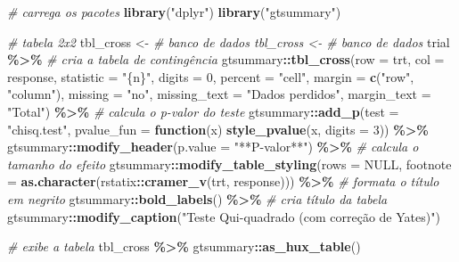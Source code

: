 \documentclass[
]{book}
\newenvironment{Shaded}{\begin{snugshade}}{\end{snugshade}}
\newcommand{\AttributeTok}[1]{\textcolor[rgb]{0.13,0.29,0.53}{#1}}
\newcommand{\CommentTok}[1]{\textcolor[rgb]{0.56,0.35,0.01}{\textit{#1}}}
\newcommand{\ConstantTok}[1]{\textcolor[rgb]{0.56,0.35,0.01}{#1}}
\newcommand{\ControlFlowTok}[1]{\textcolor[rgb]{0.13,0.29,0.53}{\textbf{#1}}}
\newcommand{\DecValTok}[1]{\textcolor[rgb]{0.00,0.00,0.81}{#1}}
\newcommand{\FunctionTok}[1]{\textcolor[rgb]{0.13,0.29,0.53}{\textbf{#1}}}
\newcommand{\NormalTok}[1]{#1}
\newcommand{\OtherTok}[1]{\textcolor[rgb]{0.56,0.35,0.01}{#1}}
\newcommand{\SpecialCharTok}[1]{\textcolor[rgb]{0.81,0.36,0.00}{\textbf{#1}}}
\newcommand{\StringTok}[1]{\textcolor[rgb]{0.31,0.60,0.02}{#1}}
\begin{document}
\begin{Shaded}
\begin{Highlighting}[]
\CommentTok{\# carrega os pacotes}
\FunctionTok{library}\NormalTok{(}\StringTok{"dplyr"}\NormalTok{)}
\FunctionTok{library}\NormalTok{(}\StringTok{"gtsummary"}\NormalTok{)}

\CommentTok{\# tabela 2x2}
\NormalTok{tbl\_cross }\OtherTok{\textless{}{-}} \CommentTok{\# banco de dados tbl\_cross \textless{}{-} \# banco de dados}
\NormalTok{trial }\SpecialCharTok{\%\textgreater{}\%}
    \CommentTok{\# cria a tabela de contingência}
\NormalTok{gtsummary}\SpecialCharTok{::}\FunctionTok{tbl\_cross}\NormalTok{(}\AttributeTok{row =}\NormalTok{ trt, }\AttributeTok{col =}\NormalTok{ response, }\AttributeTok{statistic =} \StringTok{"\{n\}"}\NormalTok{, }\AttributeTok{digits =} \DecValTok{0}\NormalTok{, }\AttributeTok{percent =} \StringTok{"cell"}\NormalTok{,}
    \AttributeTok{margin =} \FunctionTok{c}\NormalTok{(}\StringTok{"row"}\NormalTok{, }\StringTok{"column"}\NormalTok{), }\AttributeTok{missing =} \StringTok{"no"}\NormalTok{, }\AttributeTok{missing\_text =} \StringTok{"Dados perdidos"}\NormalTok{,}
    \AttributeTok{margin\_text =} \StringTok{"Total"}\NormalTok{) }\SpecialCharTok{\%\textgreater{}\%}
    \CommentTok{\# calcula o p{-}valor do teste}
\NormalTok{gtsummary}\SpecialCharTok{::}\FunctionTok{add\_p}\NormalTok{(}\AttributeTok{test =} \StringTok{"chisq.test"}\NormalTok{, }\AttributeTok{pvalue\_fun =} \ControlFlowTok{function}\NormalTok{(x) }\FunctionTok{style\_pvalue}\NormalTok{(x, }\AttributeTok{digits =} \DecValTok{3}\NormalTok{)) }\SpecialCharTok{\%\textgreater{}\%}
\NormalTok{    gtsummary}\SpecialCharTok{::}\FunctionTok{modify\_header}\NormalTok{(}\AttributeTok{p.value =} \StringTok{"**P{-}valor**"}\NormalTok{) }\SpecialCharTok{\%\textgreater{}\%}
    \CommentTok{\# calcula o tamanho do efeito}
\NormalTok{gtsummary}\SpecialCharTok{::}\FunctionTok{modify\_table\_styling}\NormalTok{(}\AttributeTok{rows =} \ConstantTok{NULL}\NormalTok{, }\AttributeTok{footnote =} \FunctionTok{as.character}\NormalTok{(rstatix}\SpecialCharTok{::}\FunctionTok{cramer\_v}\NormalTok{(trt,}
\NormalTok{    response))) }\SpecialCharTok{\%\textgreater{}\%}
    \CommentTok{\# formata o título em negrito}
\NormalTok{gtsummary}\SpecialCharTok{::}\FunctionTok{bold\_labels}\NormalTok{() }\SpecialCharTok{\%\textgreater{}\%}
    \CommentTok{\# cria título da tabela}
\NormalTok{gtsummary}\SpecialCharTok{::}\FunctionTok{modify\_caption}\NormalTok{(}\StringTok{"Teste Qui{-}quadrado (com correção de Yates)"}\NormalTok{)}

\CommentTok{\# exibe a tabela}
\NormalTok{tbl\_cross }\SpecialCharTok{\%\textgreater{}\%}
\NormalTok{    gtsummary}\SpecialCharTok{::}\FunctionTok{as\_hux\_table}\NormalTok{()}
\end{Highlighting}
\end{Shaded}
\end{document}
